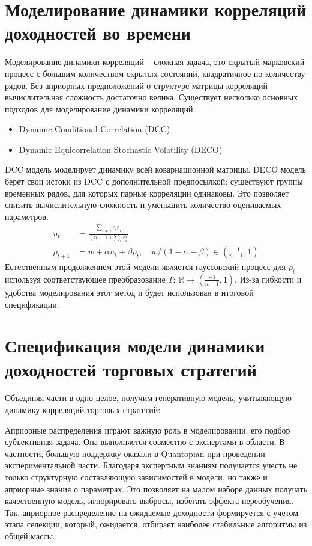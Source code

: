 \section{Моделирование динамики корреляций доходностей во времени}
Моделирование динамики корреляций -- сложная задача, это скрытый марковский процесс с большим количеством скрытых состояний, квадратичное по количеству рядов. Без априорных предположений о структуре матрицы корреляций вычислительная сложность достаточно велика. Существует несколько основных подходов для моделирование динамики корреляций.
\begin{itemize}
	\item Dynamic Conditional Correlation (DCC) \citep{engle2000}
	\item Dynamic Equicorrelation Stochastic Volatility (DECO) \citep{kurose2016}
\end{itemize}
DCC модель моделирует динамику всей ковариационной матрицы. DECO модель берет свои истоки из DCC с дополнительной предпосылкой: существуют группы временных рядов, для которых парные корреляции одинаковы. Это позволяет снизить вычислительную сложность и уменьшить количество оцениваемых параметров.
\begin{align}
u_t &= \frac{\sum_{i\neq j} r_i r_j}{(n-1) \sum_{i} r_i^2}\\
\rho_{t+1} &= w + \alpha u_t + \beta \rho_t, \quad w/(1-\alpha-\beta) \in \left(\tfrac{-1}{n-1}, 1\right)
\end{align}
Естественным продолжением этой модели является гауссовский процесс для $\rho_t$ используя соответствующее преобразование $T:\: \mathbb{R} \to \left(\tfrac{-1}{n-1}, 1\right)$. Из-за гибкости и удобства моделирования этот метод и будет использован в итоговой спецификации.

\section{Спецификация модели динамики доходностей торговых стратегий}
Объединяя части в одно целое, получим генеративную модель, учитывающую динамику корреляций торговых стратегий:


Априорные распределения играют важную роль в моделировании, его подбор субъективная задача. Она выполняется совместно с экспертами в области. В частности, большую поддержку оказали в Quantopian при проведении экспериментальной части. Благодаря экспертным знаниям получается учесть не только структурную составляющую зависимостей в модели, но также и априорные знания о параметрах. Это позволяет на малом наборе данных получать качественную модель, игнорировать выбросы, избегать эффекта переобучения. Так, априорное распределение на ожидаемые доходности формируется с учетом этапа селекции, который, ожидается, отбирает наиболее стабильные алгоритмы из общей массы.


